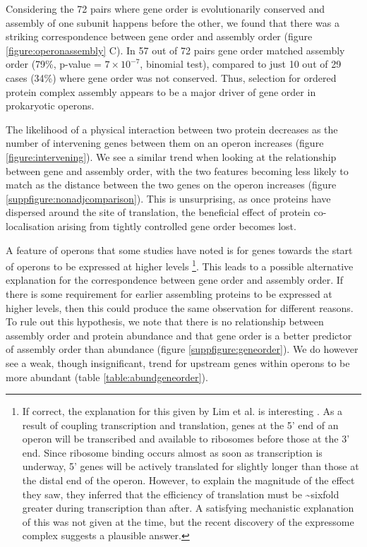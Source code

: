 \documentclass[a4paper,11pt,twoside,openright]{scrbook}
\begin{document}
Considering the 72 pairs where gene order is evolutionarily conserved and
assembly of one subunit happens before the other, we found that there was a
striking correspondence between gene order and assembly order (figure
\ref{figure:operonassembly} C). In 57 out of 72 pairs gene order matched
assembly order (79\%, p-value = \(7 \times 10^{-7}\), binomial test), compared
to just 10 out of 29 cases (34\%) where gene order was not conserved. Thus,
selection for ordered protein complex assembly appears to be a major driver of
gene order in prokaryotic operons.

The likelihood of a physical interaction between two protein decreases as the
number of intervening genes between them on an operon increases (figure
\ref{figure:intervening}). We see a similar trend when looking at the
relationship between gene and assembly order, with the two features becoming
less likely to match as the distance between the two genes on the operon
increases (figure \ref{suppfigure:nonadjcomparison}). This is unsurprising, as
once proteins have dispersed around the site of translation, the beneficial
effect of protein co-localisation arising from tightly controlled gene order
becomes lost.

A feature of operons that some studies have noted is for genes towards the start
of operons to be expressed at higher levels \cite{Nishizaki2007,Lim2011}
\footnote{If correct, the explanation for this given by Lim et al. is
interesting \cite{Lim2011}. As a result of coupling transcription and
translation, genes at the 5' end of an operon will be transcribed and available
to ribosomes before those at the 3' end. Since ribosome binding occurs almost as
soon as transcription is underway, 5' genes will be actively translated for
slightly longer than those at the distal end of the operon. However, to explain
the magnitude of the effect they saw, they inferred that the efficiency of
translation must be \textasciitilde sixfold greater during transcription than
after. A satisfying mechanistic explanation of this was not given at the time,
but the recent discovery of the expressome complex \cite{Kohler2017} suggests a
plausible answer.}. This leads to a possible alternative explanation for the
correspondence between gene order and assembly order. If there is some
requirement for earlier assembling proteins to be expressed at higher levels,
then this could produce the same observation for different reasons. To rule out
this hypothesis, we note that there is no relationship between assembly order
and protein abundance and that gene order is a better predictor of assembly
order than abundance (figure \ref{suppfigure:geneorder}). We do however see a
weak, though insignificant, trend for upstream genes within operons to be more
abundant (table \ref{table:abundgeneorder}).
\end{document}
